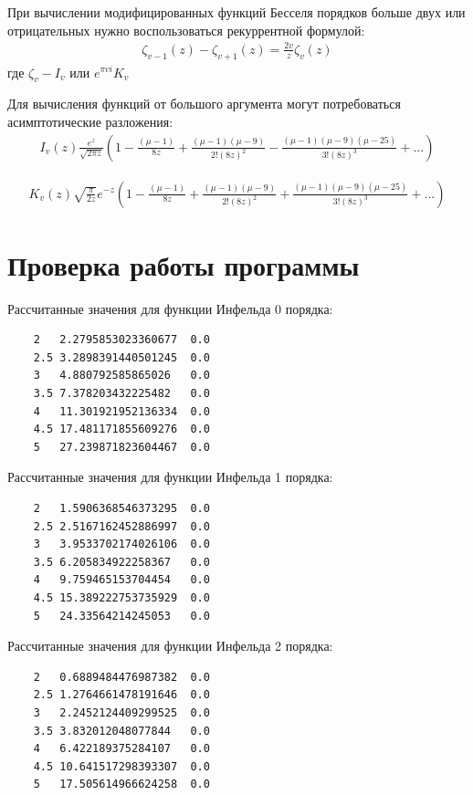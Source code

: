 \documentclass[a4paper,14pt]{extarticle}
\begin{document}
При вычислении модифицированных функций Бесселя порядков больше двух или отрицательных нужно воспользоваться рекуррентной формулой:
\begin{align*}
	\zeta_{v-1}(z) - \zeta_{v+1}(z) = \frac{2v}{z} \zeta_v (z)
\end{align*}
где $\zeta_v - I_v$ или $e^{\pi v i} K_v$

Для вычисления функций от большого аргумента могут потребоваться асимптотические разложения:
\begin{align*}
	I_v(z) \frac{e^z}{\sqrt{2 \pi z}} (1 - \frac{(\mu-1)}{8z} + \frac{(\mu-1)(\mu-9)}{2!(8z)^2} - \frac{(\mu-1)(\mu-9)(\mu-25)}{3!(8z)^3} + ...)
\end{align*}

\begin{align*}
	K_v(z) \sqrt{\frac{\pi}{2z}} e^{-z} (1 - \frac{(\mu-1)}{8z} + \frac{(\mu-1)(\mu-9)}{2!(8z)^2} + \frac{(\mu-1)(\mu-9)(\mu-25)}{3!(8z)^3} + ...)
\end{align*}

\section{Проверка работы программы}
Рассчитанные значения для функции Инфельда 0 порядка:
\begin{verbatim}
	2	2.2795853023360677	0.0
	2.5	3.2898391440501245	0.0
	3	4.880792585865026	0.0
	3.5	7.378203432225482	0.0
	4	11.301921952136334	0.0
	4.5	17.481171855609276	0.0
	5	27.239871823604467	0.0
\end{verbatim}

Рассчитанные значения для функции Инфельда 1 порядка:
\begin{verbatim}
	2	1.5906368546373295	0.0
	2.5	2.5167162452886997	0.0
	3	3.9533702174026106	0.0
	3.5	6.205834922258367	0.0
	4	9.759465153704454	0.0
	4.5	15.389222753735929	0.0
	5	24.33564214245053	0.0
\end{verbatim}

Рассчитанные значения для функции Инфельда 2 порядка:
\begin{verbatim}
	2	0.6889484476987382	0.0
	2.5	1.2764661478191646	0.0
	3	2.2452124409299525	0.0
	3.5	3.832012048077844	0.0
	4	6.422189375284107	0.0
	4.5	10.641517298393307	0.0
	5	17.505614966624258	0.0
\end{verbatim}
\end{document}
